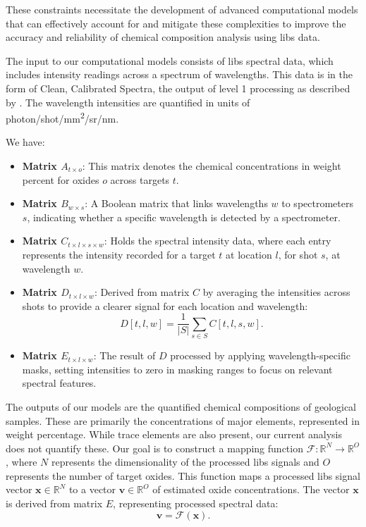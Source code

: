 These constraints necessitate the development of advanced computational models that can effectively account for and mitigate these complexities to improve the accuracy and reliability of chemical composition analysis using \gls{libs} data.

The input to our computational models consists of \gls{libs} spectral data, which includes intensity readings across a spectrum of wavelengths. This data is in the form of Clean, Calibrated Spectra\cite{andersonImprovedAccuracyQuantitative2017}, the output of level 1 processing as described by \citet{wiensPreflightCalibrationInitial2013}. The wavelength intensities are quantified in units of photon/shot/mm\textsuperscript{2}/sr/nm.

We have:

\begin{itemize}
    \item \textbf{Matrix $A_{t \times o}$}: This matrix denotes the chemical concentrations in weight percent for oxides $o$ across targets $t$.
    \item \textbf{Matrix $B_{w \times s}$}: A Boolean matrix that links wavelengths $w$ to spectrometers $s$, indicating whether a specific wavelength is detected by a spectrometer.
    \item \textbf{Matrix $C_{t \times l \times s \times w}$}: Holds the spectral intensity data, where each entry represents the intensity recorded for a target $t$ at location $l$, for shot $s$, at wavelength $w$.
    \item \textbf{Matrix $D_{t \times l \times w}$}: Derived from matrix $C$ by averaging the intensities across shots to provide a clearer signal for each location and wavelength:
    \[
    D[t, l, w] = \frac{1}{|S|} \sum_{s \in S} C[t, l, s, w].
    \]
    \item \textbf{Matrix $E_{t \times l \times w}$}: The result of $D$ processed by applying wavelength-specific masks, setting intensities to zero in masking ranges to focus on relevant spectral features.
\end{itemize}

The outputs of our models are the quantified chemical compositions of geological samples. These are primarily the concentrations of major elements, represented in weight percentage. While trace elements are also present, our current analysis does not quantify these.
Our goal is to construct a mapping function $\mathcal{F}: \mathbb{R}^N \rightarrow \mathbb{R}^O$, where $N$ represents the dimensionality of the processed \gls{libs} signals and $O$ represents the number of target oxides. This function maps a processed \gls{libs} signal vector $\mathbf{x} \in \mathbb{R}^N$ to a vector $\mathbf{v} \in \mathbb{R}^O$ of estimated oxide concentrations. The vector $\mathbf{x}$ is derived from matrix $E$, representing processed spectral data:
\[
\mathbf{v} = \mathcal{F}(\mathbf{x}).
\]

